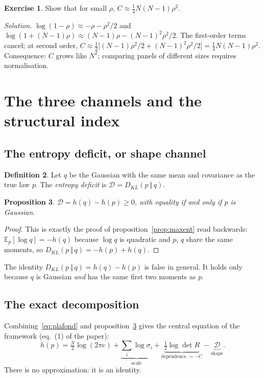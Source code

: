 \documentclass[11pt]{article}
\theoremstyle{plain}
\newtheorem{proposition}{Proposition}[section]
\theoremstyle{definition}
\newtheorem{definition}[proposition]{Definition}
\newtheorem{exercice}[proposition]{Exercise}
\theoremstyle{remark}
\newcommand{\DD}{\mathcal{D}}
\newcommand{\E}{\mathbb{E}}
\newcommand{\KL}[2]{D_{KL}\!\left(#1\,\Vert\,#2\right)}
\begin{document}
\begin{exercice}
Show that for small $\rho$, $C\approx\tfrac14N(N-1)\rho^2$.
\end{exercice}
\noindent\emph{Solution.} $\log(1-\rho)\approx-\rho-\rho^2/2$ and
$\log(1+(N-1)\rho)\approx(N-1)\rho-(N-1)^2\rho^2/2$. The first-order terms
cancel; at second order,
$C\approx\tfrac12\bigl[(N-1)\rho^2/2+(N-1)^2\rho^2/2\bigr]=\tfrac14N(N-1)\rho^2$.
Consequence: $C$ grows like $N^2$; comparing panels of different sizes
requires normalisation.

\section{The three channels and the structural index}
\label{sec:canaux}

\subsection{The entropy deficit, or shape channel}

\begin{definition}
Let $q$ be the Gaussian with the same mean and covariance as the true law $p$.
The \emph{entropy deficit} is $\DD=\KL{p}{q}$.
\end{definition}

\begin{proposition}
\label{prop:deficit}
$\DD=h(q)-h(p)\ge0$, with equality if and only if $p$ is Gaussian.
\end{proposition}

\begin{proof}
This is exactly the proof of proposition~\ref{prop:maxent} read backwards:
$\E_p[\log q]=-h(q)$ because $\log q$ is quadratic and $p$, $q$ share the same
moments, so $\KL{p}{q}=-h(p)+h(q)$.
\end{proof}

\begin{piege}
The identity $\KL{p}{q}=h(q)-h(p)$ is false in general. It holds only because
$q$ is Gaussian \emph{and} has the same first two moments as $p$.
\end{piege}

\subsection{The exact decomposition}

Combining~\eqref{eq:plafond} and proposition~\ref{prop:deficit} gives the
central equation of the framework (eq.~(1) of the paper):
\begin{equation}
\label{eq:trois}
h(p)=\tfrac N2\log(2\pi e)
+\underbrace{\sum_i\log\sigma_i}_{\text{scale}}
+\underbrace{\tfrac12\log\det R}_{\text{dependence }=-C}
-\underbrace{\DD}_{\text{shape}} .
\end{equation}
There is no approximation: it is an identity.
\end{document}
